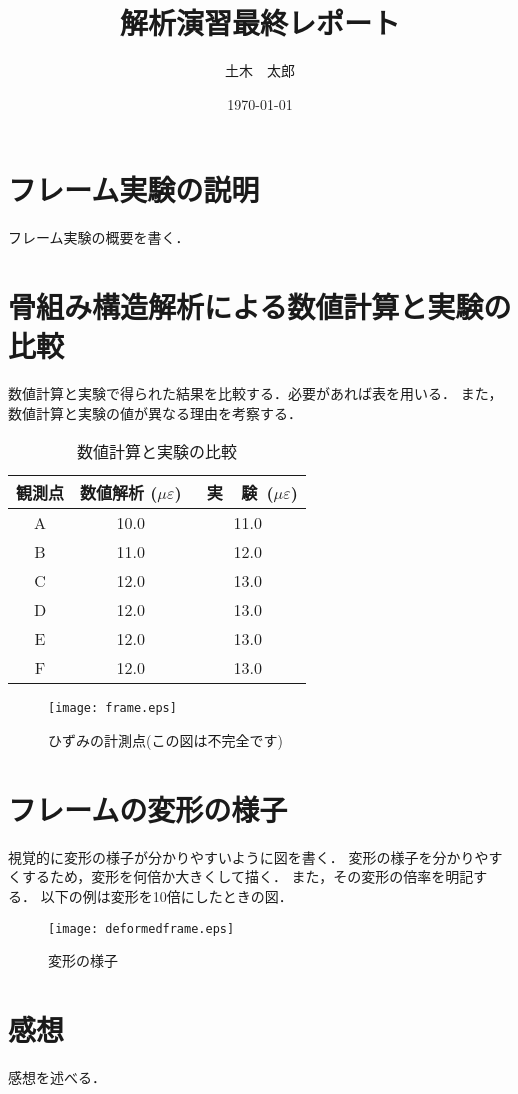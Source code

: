 \documentclass{jarticle}
\title{解析演習最終レポート}
\author{土木　太郎}
\date{\today}
\begin{document}
\maketitle

\section{フレーム実験の説明}
フレーム実験の概要を書く．

\section{骨組み構造解析による数値計算と実験の比較}
数値計算と実験で得られた結果を比較する．必要があれば表を用いる．
また，数値計算と実験の値が異なる理由を考察する．
 \begin{table}[h]
  \caption{数値計算と実験の比較}
  \centering
 \begin{tabular}[t]{c|cc}\hline
  観測点&数値解析 ($\mu\varepsilon$) & ~実~~験~($\mu\varepsilon$)\\\hline
A  & 10.0& 11.0\\
B  & 11.0& 12.0\\
C  & 12.0& 13.0\\
D  & 12.0& 13.0\\
E  & 12.0& 13.0\\
F  & 12.0& 13.0\\\hline
 \end{tabular} 
 \end{table}
  \begin{figure}[h]
   \centering
\texttt{[image: frame.eps]}
  \caption{ひずみの計測点(この図は不完全です)}
  \end{figure}

 \section{フレームの変形の様子}
 視覚的に変形の様子が分かりやすいように図を書く．
 変形の様子を分かりやすくするため，変形を何倍か大きくして描く．
 また，その変形の倍率を明記する．
 以下の例は変形を10倍にしたときの図．
  \begin{figure}[h]
\centering
\texttt{[image: deformedframe.eps]}
  \caption{変形の様子}
  \end{figure}
 
\section{感想}
感想を述べる．
\end{document}
